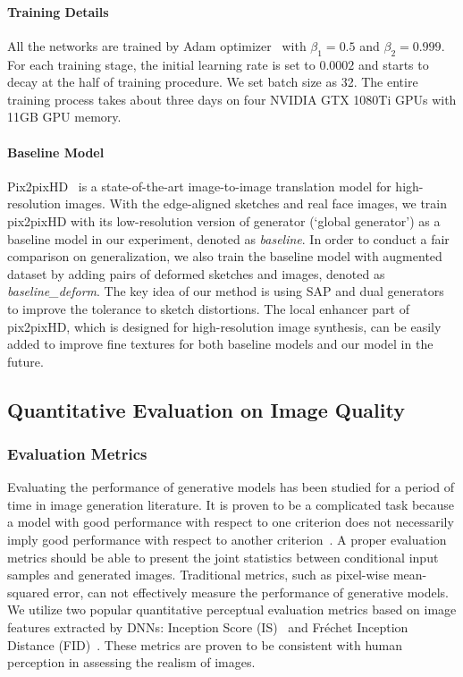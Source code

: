 \paragraph{Training Details}
All the networks are trained by Adam optimizer~\cite{Adam} with $\beta_1=0.5$ and $\beta_2=0.999$. 
For each training stage, the initial learning rate is set to $0.0002$ and starts to decay at the half of training procedure. 
We set batch size as 32. 
The entire training process takes about three days on four NVIDIA GTX 1080Ti GPUs with 11GB GPU memory.



\paragraph{Baseline Model} 
Pix2pixHD~\cite{pix2pixHD} is a state-of-the-art image-to-image translation model for high-resolution images. 
With the edge-aligned sketches and real face images, we train pix2pixHD with its low-resolution version of generator (`global generator') as a baseline model in our experiment, denoted as \textit{baseline}. 
In order to conduct a fair comparison on generalization, we also train the baseline model with augmented dataset by adding pairs of deformed sketches and images, denoted as \textit{baseline\_deform}.
%
The key idea of our method is using SAP and dual generators to improve the tolerance to sketch distortions. The local enhancer part of pix2pixHD, which is designed for high-resolution image synthesis, can be easily added to improve fine textures for both baseline models and our model in the future. 


\subsection{Quantitative Evaluation on Image Quality}

\subsubsection{Evaluation Metrics} 
Evaluating the performance of generative models has been studied for a period of time in image generation literature.
It is proven to be a complicated task because a model with good performance with respect to one criterion does not necessarily imply good performance with respect to another criterion~\cite{GANs_equal}. 
A proper evaluation metrics should be able to present the joint statistics between conditional input samples and generated images.
Traditional metrics, such as pixel-wise mean-squared error, can not effectively measure the performance of generative models. 
We utilize two popular quantitative perceptual evaluation metrics based on image features extracted by DNNs: Inception Score (IS)~\cite{Improved_Techniques} and Fréchet Inception Distance (FID)~\cite{FID}.
These metrics are proven to be consistent with human perception in assessing the realism of images.

